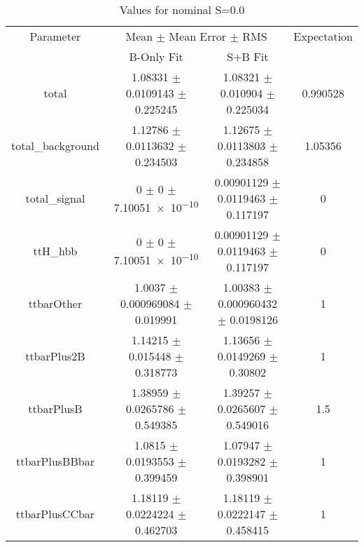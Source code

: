 \begin{table}
\centering
\caption{Values for nominal S=0.0}
\begin{tabular}{cccc}
\toprule
Parameter & \multicolumn{2}{c}{Mean $\pm$ Mean Error $\pm$ RMS} & Expectation\\
 & B-Only Fit & S+B Fit & \\
\midrule
total & \num{1.08331} $\pm$ \num{0.0109143} $\pm$ \num{0.225245} & \num{1.08321} $\pm$ \num{0.010904} $\pm$ \num{0.225034} & \num{0.990528}\\
total\_background & \num{1.12786} $\pm$ \num{0.0113632} $\pm$ \num{0.234503} & \num{1.12675} $\pm$ \num{0.0113803} $\pm$ \num{0.234858} & \num{1.05356}\\
total\_signal & \num{0} $\pm$ \num{0} $\pm$ \num{7.10051e-10} & \num{0.00901129} $\pm$ \num{0.0119463} $\pm$ \num{0.117197} & \num{0}\\
ttH\_hbb & \num{0} $\pm$ \num{0} $\pm$ \num{7.10051e-10} & \num{0.00901129} $\pm$ \num{0.0119463} $\pm$ \num{0.117197} & \num{0}\\
ttbarOther & \num{1.0037} $\pm$ \num{0.000969084} $\pm$ \num{0.019991} & \num{1.00383} $\pm$ \num{0.000960432} $\pm$ \num{0.0198126} & \num{1}\\
ttbarPlus2B & \num{1.14215} $\pm$ \num{0.015448} $\pm$ \num{0.318773} & \num{1.13656} $\pm$ \num{0.0149269} $\pm$ \num{0.30802} & \num{1}\\
ttbarPlusB & \num{1.38959} $\pm$ \num{0.0265786} $\pm$ \num{0.549385} & \num{1.39257} $\pm$ \num{0.0265607} $\pm$ \num{0.549016} & \num{1.5}\\
ttbarPlusBBbar & \num{1.0815} $\pm$ \num{0.0193553} $\pm$ \num{0.399459} & \num{1.07947} $\pm$ \num{0.0193282} $\pm$ \num{0.398901} & \num{1}\\
ttbarPlusCCbar & \num{1.18119} $\pm$ \num{0.0224224} $\pm$ \num{0.462703} & \num{1.18119} $\pm$ \num{0.0222147} $\pm$ \num{0.458415} & \num{1}\\
\bottomrule
\end{tabular}
\end{table}